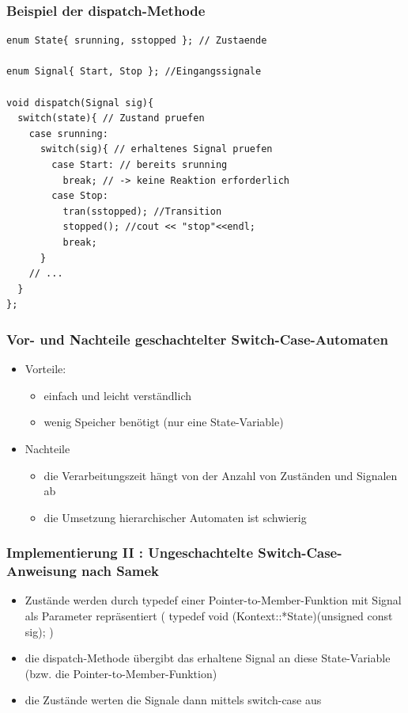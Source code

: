 \documentclass{beamer}
\begin{document}
\begin{frame}[fragile]
  \frametitle{Beispiel der dispatch-Methode}
  \begin{lstlisting}
enum State{ srunning, sstopped }; // Zustaende

enum Signal{ Start, Stop }; //Eingangssignale

void dispatch(Signal sig){
  switch(state){ // Zustand pruefen
    case srunning:
      switch(sig){ // erhaltenes Signal pruefen
        case Start: // bereits srunning  
          break; // -> keine Reaktion erforderlich
        case Stop:
          tran(sstopped); //Transition
          stopped(); //cout << "stop"<<endl;
          break;
      }
    // ...
  }  
};
  \end{lstlisting}
\end{frame}

\begin{frame}
  \frametitle{Vor- und Nachteile geschachtelter Switch-Case-Automaten}
  \begin{itemize}
    \item Vorteile:
    \begin{itemize}
      \item einfach und leicht verst\"andlich
      \item wenig Speicher ben\"otigt (nur eine State-Variable)
    \end{itemize}
    \item Nachteile
    \begin{itemize}
      \item die Verarbeitungszeit h\"angt von der Anzahl von Zust\"anden und Signalen ab
      \item die Umsetzung hierarchischer Automaten ist schwierig 
    \end{itemize}
  \end{itemize}
\end{frame}

\begin{frame}
  \frametitle{Implementierung II : Ungeschachtelte Switch-Case-Anweisung nach Samek}
  \begin{itemize}
    \item Zust\"ande werden durch typedef einer Pointer-to-Member-Funktion mit Signal als Parameter repr\"asentiert (  typedef void (Kontext::*State)(unsigned const sig);  )
    \item die dispatch-Methode \"ubergibt das erhaltene Signal an diese State-Variable (bzw. die Pointer-to-Member-Funktion) 
    \item die Zust\"ande werten die Signale dann mittels switch-case aus
  \end{itemize}
\end{frame}
\end{document}
